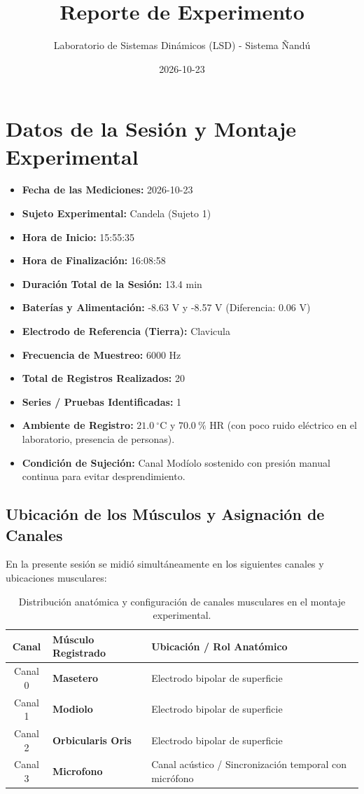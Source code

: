 \documentclass[11pt,a4paper]{article}
\title{\textbf{Reporte de Experimento}}
\author{Laboratorio de Sistemas Dinámicos (LSD) - Sistema Ñandú}
\date{2026-10-23}
\begin{document}
\maketitle

\section{Datos de la Sesión y Montaje Experimental}
\begin{itemize}
    \item \textbf{Fecha de las Mediciones:} 2026-10-23
    \item \textbf{Sujeto Experimental:} Candela (Sujeto 1)
    \item \textbf{Hora de Inicio:} 15:55:35
    \item \textbf{Hora de Finalización:} 16:08:58
    \item \textbf{Duración Total de la Sesión:} 13.4 min
    \item \textbf{Baterías y Alimentación:} -8.63 V y -8.57 V (Diferencia: 0.06 V)
    \item \textbf{Electrodo de Referencia (Tierra):} Clavicula
    \item \textbf{Frecuencia de Muestreo:} 6000 Hz
    \item \textbf{Total de Registros Realizados:} 20
    \item \textbf{Series / Pruebas Identificadas:} 1
    \item \textbf{Ambiente de Registro:} $21.0\ ^\circ\text{C}$ y $70.0\ \%\text{ HR}$ (con poco ruido eléctrico en el laboratorio, presencia de personas).
    \item \textbf{Condición de Sujeción:} Canal Modíolo sostenido con presión manual continua para evitar desprendimiento.
\end{itemize}

\subsection{Ubicación de los Músculos y Asignación de Canales}
En la presente sesión se midió simultáneamente en los siguientes canales y ubicaciones musculares:
\begin{table}[H]
\centering
\begin{tabularx}{\textwidth}{c p{6.5cm} X}
\toprule
\textbf{Canal} & \textbf{Músculo Registrado} & \textbf{Ubicación / Rol Anatómico} \\
\midrule
Canal 0 & \textbf{Masetero} & Electrodo bipolar de superficie \\
Canal 1 & \textbf{Modiolo} & Electrodo bipolar de superficie \\
Canal 2 & \textbf{Orbicularis Oris} & Electrodo bipolar de superficie \\
Canal 3 & \textbf{Microfono} & Canal acústico / Sincronización temporal con micrófono \\
\bottomrule
\end{tabularx}
\caption{Distribución anatómica y configuración de canales musculares en el montaje experimental.}
\end{table}
\end{document}
